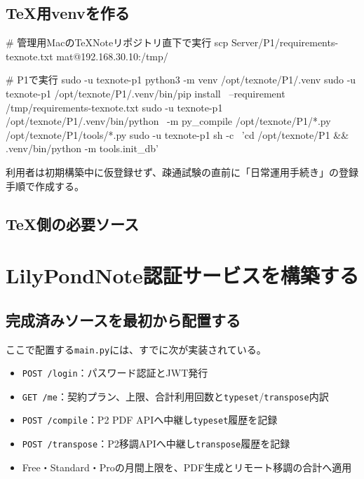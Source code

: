\documentclass[uplatex,a4paper,11pt]{jsarticle}
\begin{document}
\subsection{TeX用venvを作る}

\begin{command}
# 管理用MacのTeXNoteリポジトリ直下で実行
scp Server/P1/requirements-texnote.txt mat@192.168.30.10:/tmp/

# P1で実行
sudo -u texnote-p1 python3 -m venv /opt/texnote/P1/.venv
sudo -u texnote-p1 /opt/texnote/P1/.venv/bin/pip install \
  --requirement /tmp/requirements-texnote.txt
sudo -u texnote-p1 /opt/texnote/P1/.venv/bin/python \
  -m py_compile /opt/texnote/P1/*.py /opt/texnote/P1/tools/*.py
sudo -u texnote-p1 sh -c \
  'cd /opt/texnote/P1 && .venv/bin/python -m tools.init_db'
\end{command}

利用者は初期構築中に仮登録せず、疎通試験の直前に「日常運用手続き」の登録手順で作成する。

\subsection{TeX側の必要ソース}







\section{LilyPondNote認証サービスを構築する}

\subsection{完成済みソースを最初から配置する}

ここで配置する\texttt{main.py}には、すでに次が実装されている。

\begin{itemize}
  \item \texttt{POST /login}：パスワード認証とJWT発行
  \item \texttt{GET /me}：契約プラン、上限、合計利用回数と\texttt{typeset}/\texttt{transpose}内訳
  \item \texttt{POST /compile}：P2 PDF APIへ中継し\texttt{typeset}履歴を記録
  \item \texttt{POST /transpose}：P2移調APIへ中継し\texttt{transpose}履歴を記録
  \item Free・Standard・Proの月間上限を、PDF生成とリモート移調の合計へ適用
\end{itemize}
\end{document}
